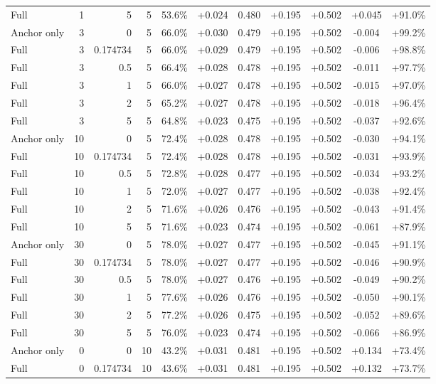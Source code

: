 \begin{table}[htbp]
\begin{tabular}{lrrrccccccc}
Full & 1 & 5 & 5 & 53.6\% & +0.024 & 0.480 & +0.195 & +0.502 & +0.045 & +91.0\% \\
Anchor only & 3 & 0 & 5 & 66.0\% & +0.030 & 0.479 & +0.195 & +0.502 & -0.004 & +99.2\% \\
Full & 3 & 0.174734 & 5 & 66.0\% & +0.029 & 0.479 & +0.195 & +0.502 & -0.006 & +98.8\% \\
Full & 3 & 0.5 & 5 & 66.4\% & +0.028 & 0.478 & +0.195 & +0.502 & -0.011 & +97.7\% \\
Full & 3 & 1 & 5 & 66.0\% & +0.027 & 0.478 & +0.195 & +0.502 & -0.015 & +97.0\% \\
Full & 3 & 2 & 5 & 65.2\% & +0.027 & 0.478 & +0.195 & +0.502 & -0.018 & +96.4\% \\
Full & 3 & 5 & 5 & 64.8\% & +0.023 & 0.475 & +0.195 & +0.502 & -0.037 & +92.6\% \\
Anchor only & 10 & 0 & 5 & 72.4\% & +0.028 & 0.478 & +0.195 & +0.502 & -0.030 & +94.1\% \\
Full & 10 & 0.174734 & 5 & 72.4\% & +0.028 & 0.478 & +0.195 & +0.502 & -0.031 & +93.9\% \\
Full & 10 & 0.5 & 5 & 72.8\% & +0.028 & 0.477 & +0.195 & +0.502 & -0.034 & +93.2\% \\
Full & 10 & 1 & 5 & 72.0\% & +0.027 & 0.477 & +0.195 & +0.502 & -0.038 & +92.4\% \\
Full & 10 & 2 & 5 & 71.6\% & +0.026 & 0.476 & +0.195 & +0.502 & -0.043 & +91.4\% \\
Full & 10 & 5 & 5 & 71.6\% & +0.023 & 0.474 & +0.195 & +0.502 & -0.061 & +87.9\% \\
Anchor only & 30 & 0 & 5 & 78.0\% & +0.027 & 0.477 & +0.195 & +0.502 & -0.045 & +91.1\% \\
Full & 30 & 0.174734 & 5 & 78.0\% & +0.027 & 0.477 & +0.195 & +0.502 & -0.046 & +90.9\% \\
Full & 30 & 0.5 & 5 & 78.0\% & +0.027 & 0.476 & +0.195 & +0.502 & -0.049 & +90.2\% \\
Full & 30 & 1 & 5 & 77.6\% & +0.026 & 0.476 & +0.195 & +0.502 & -0.050 & +90.1\% \\
Full & 30 & 2 & 5 & 77.2\% & +0.026 & 0.475 & +0.195 & +0.502 & -0.052 & +89.6\% \\
Full & 30 & 5 & 5 & 76.0\% & +0.023 & 0.474 & +0.195 & +0.502 & -0.066 & +86.9\% \\
Anchor only & 0 & 0 & 10 & 43.2\% & +0.031 & 0.481 & +0.195 & +0.502 & +0.134 & +73.4\% \\
Full & 0 & 0.174734 & 10 & 43.6\% & +0.031 & 0.481 & +0.195 & +0.502 & +0.132 & +73.7\% \\

\end{tabular}
\end{table}

